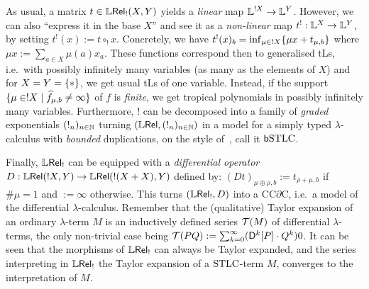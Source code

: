 \documentclass[submission,%
]{eptcs}
\begin{document}
 As usual, a matrix $t\in{\mathbb{L}\mathsf{Rel}_!}(X,Y)$ yields a \emph{linear} map $\mathbb{L}^{!X}\to\mathbb{L}^Y$. However, we can also ``express it in the base $X$'' and see it as a \emph{non-linear} map $t^!:\mathbb{L}^X\to\mathbb{L}^Y$, by setting 
 $t^!(x):=t\circ_! x$.
 Concretely, we have $t^!(x)_b=\inf_{\mu\in !X} \{\mu x+ t_{\mu,b}\}$
 where $\mu x:=\sum_{a\in X} \mu(a)x_a$.
 These functions correspond then to generalised tLs, i.e.\ with possibly infinitely many variables (as many as the elements of $X$) and for $X=Y=\{*\}$, we get usual tLs of one variable.
Instead, if the support $\{\mu\in!X\mid\widehat{f}_{\mu,b}\neq\infty\}$ of $f$ is \emph{finite}, we get %
tropical polynomials in possibly infinitely many variables.
Furthermore, $!$ can be decomposed into a family of \emph{graded} exponentials $(!_n)_{n\in\mathbb{N}}$ turning $(\mathbb{L} \mathsf{Rel},(!_n)_{n\in\mathbb{N}})$ in a model for a %
simply typed $\lambda$-calculus with \emph{bounded} duplications, on the style of~\cite{Brunel2014}, call it $\mathsf b\mathrm{STLC}$.%

 
Finally, $\mathbb{L} \mathsf{Rel}_!$ can be equipped with a \emph{differential operator} $D:{\mathbb{L} \mathsf{Rel}}(!X,Y)\to {\mathbb{L}\mathsf{Rel}}(!(X+X),Y)$ defined by: $(Dt)_{\mu\oplus\rho,b}:=t_{\rho+\mu,b}$ if $\#\mu=1$ and $:=\infty$ otherwise. %
This turns $(\mathbb{L} \mathsf{Rel}_!,D)$ into a CC$\partial$C, i.e.\ a model of the differential $\lambda$-calculus.
Remember that the (qualitative) Taylor expansion of an ordinary $\lambda$-term $M$ is an inductively defined series $\mathcal{T}(M)$ of differential $\lambda$-terms, the only non-trivial case being $\mathcal{T}(PQ) :=  \sum_{k=0}^{\infty} (\mathsf{D}^{k}[P] \cdot Q^{k})0$.
It can be seen that the morphisms of $\mathbb{L} \mathsf{Rel}_!$ can always be Taylor expanded, and the series interpreting in $\mathbb{L} \mathsf{Rel}_!$ the Taylor expansion of a $\mathrm{STLC}$-term $M$, converges to the interpretation of $M$.

%
%
\end{document}

